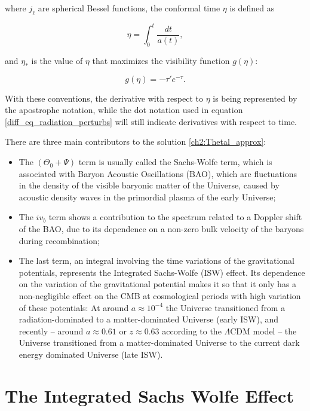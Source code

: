 \documentclass[openany,a4paper,12pt,oneside]{book}
\begin{document}
\begin{spacing}{1.5}
\noindent where $j_\ell$ are spherical Bessel functions, the conformal time $\eta$ is defined as

\begin{equation}\label{def:conformal_time}
    \eta=\int_0^t \frac{dt}{a(t)},
\end{equation}

\noindent and $\eta_*$ is the value of $\eta$ that maximizes the visibility function $g(\eta)$:

\begin{equation}\label{def:visibility_function}
    g(\eta)=-\tau'e^{-\tau}.
\end{equation}

With these conventions, the derivative with respect to $\eta$ is being represented by the apostrophe notation, while the dot notation used in equation \eqref{diff_eq_radiation_perturbs} will still indicate derivatives with respect to time.

There are three main contributors to the solution \eqref{ch2:Thetal_approx}:

\begin{itemize}
    \item The $(\Theta_0+\Psi)$ term is usually called the Sachs-Wolfe term, which is associated with Baryon Acoustic Oscillations (BAO), which are fluctuations in the density of the visible baryonic matter of the Universe, caused by acoustic density waves in the primordial plasma of the early Universe\cite{dodelson2020modern};
    \item The $iv_b$ term shows a contribution to the spectrum related to a Doppler shift of the BAO, due to its dependence on a non-zero bulk velocity of the baryons during recombination;
    \item The last term, an integral involving the time variations of the gravitational potentials, represents the Integrated Sachs-Wolfe (ISW) effect. Its dependence on the variation of the gravitational potential makes it so that it only has a non-negligible effect on the CMB at cosmological periods with high variation of these potentials: At around $a\approx 10^{-4}$ the Universe transitioned from a radiation-dominated to a matter-dominated Universe (early ISW), and recently -- around $a\approx 0.61$ or $z\approx 0.63$\cite{dark_energy_era} according to the $\Lambda$CDM model -- the Universe transitioned from a matter-dominated Universe to the current dark energy dominated Universe (late ISW). 
\end{itemize}

\section{The Integrated Sachs Wolfe Effect}\label{ch2:ISW_effect_section}


\end{spacing}
\end{document}
